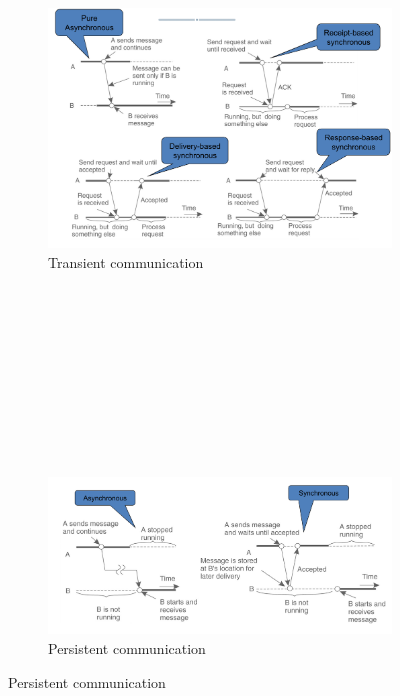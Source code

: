 \documentclass[10pt,a4paper]{article}
\begin{document}
\begin{figure}
	\begin{subfigure}{.9\textwidth}
 \hfill \includegraphics[width=400pt]{images/transient.png}\hspace*{\fill}
 \caption{Transient communication}
  \label{fig:transient}
	\end{subfigure} \\
\\ \\ \\ \\ \\ \\ \\ \\ \begin{subfigure}{.9\textwidth}
 \hfill \includegraphics[width=400pt]{images/persistent.png}\hspace*{\fill}
  \caption{Persistent communication}
  \label{fig:persistent}
	\end{subfigure}
\end{figure} \pagebreak 
\end{document}
